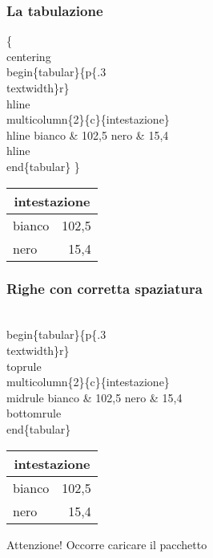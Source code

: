 \documentclass[svgnames,%
	ucs,%
	pdftex]{guitbeamer}
\begin{document}
\begin{frame}
  \frametitle{La tabulazione}
	\begin{LaTeXcode}
		\alert{\{\\centering}\n
		\\begin\{tabular\}\{p\{.3\\textwidth\}r\}\
		\\hline \n
		\\multicolumn\{2\}\{c\}\{intestazione\}\bs\bs \
		\\hline \n
		\hspace*{5ex}bianco \& 102,5 \bs\bs\n
		\hspace*{5ex}nero   \& 15,4 \bs\bs\
		\\hline\n
		\\end\{tabular\}\n
		\alert{\}}
	\end{LaTeXcode}
	\begin{LaTeXoutput}\centering
		\begin{tabular}{p{.3\textwidth}r}\hline
		\multicolumn{2}{c}{intestazione}\\\hline
		bianco & 102,5 \\
		nero   & 15,4 \\\hline
		\end{tabular}
	\end{LaTeXoutput}
\end{frame}
\begin{frame}
  \frametitle{Righe con corretta spaziatura}
	\begin{LaTeXcode}
		\\begin\{tabular\}\{p\{.3\\textwidth\}r\}\
		\alert{\\toprule} \n
		\\multicolumn\{2\}\{c\}\{intestazione\}\bs\bs \
		\alert{\\midrule} \n
		\hspace*{5ex}bianco \& 102,5 \bs\bs\n
		\hspace*{5ex}nero   \& 15,4 \bs\bs\
		\alert{\\bottomrule}\n
		\\end\{tabular\}
	\end{LaTeXcode}
	\begin{LaTeXoutput}\centering
		\begin{tabular}{p{}r}\toprule
		\multicolumn{2}{c}{intestazione}\\\midrule
		bianco & 102,5 \\
		nero   & 15,4 \\\bottomrule
		\end{tabular}
	\end{LaTeXoutput}
  \bigskip
	\begin{block}{Attenzione!}
		Occorre caricare il pacchetto 
	\end{block}

\end{frame}
\end{document}

